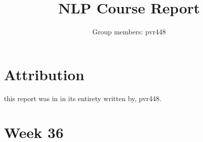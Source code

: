 \documentclass[11pt]{article}
\begin{document}
\nolinenumbers  %


\title{NLP Course Report}
\author{Group members: pvr448}

\maketitle

\section{Attribution}
this report was in in its entirety written by, pvr448.

\section{Week 36}
\label{week36}
\end{document}

